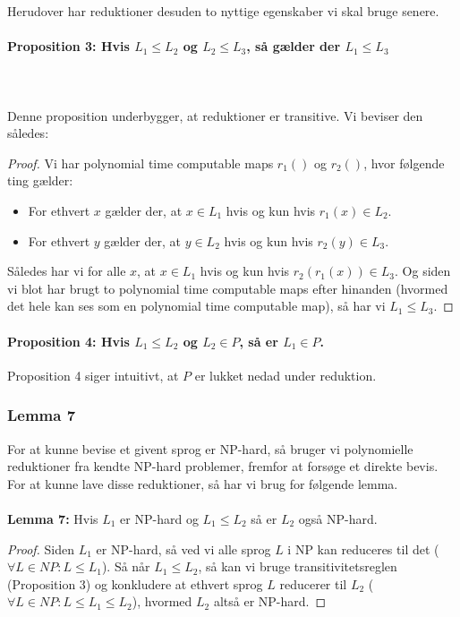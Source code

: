 Herudover har  reduktioner desuden to nyttige egenskaber vi skal bruge senere.

\paragraph{Proposition 3: Hvis $L_1 \leq L_2$ og $L_2 \leq L_3$, så gælder der $L_1 \leq L_3$}
~\\
~\\
Denne proposition underbygger, at reduktioner er transitive. Vi beviser den således:

\begin{proof}
 Vi har polynomial time computable maps $r_1()$ og $r_2()$, hvor følgende ting gælder:

\begin{itemize}
 \item For ethvert $x$ gælder der, at $x \in L_1$ hvis og kun hvis $r_1(x) \in L_2$.
 \item For ethvert $y$ gælder der, at $y \in L_2$ hvis og kun hvis $r_2(y) \in L_3$.
\end{itemize}

Således har vi for alle $x$, at $x \in L_1$ hvis og kun hvis $r_2(r_1(x)) \in L_3$. Og siden vi blot har brugt to polynomial time computable maps efter hinanden (hvormed det hele kan ses som en polynomial time computable map), så har vi $L_1 \leq L_3$.
\end{proof}

\paragraph{Proposition 4: Hvis $L_1 \leq L_2$ og $L_2 \in P$, så er $L_1 \in P$.}

Proposition 4 siger intuitivt, at $P$ er lukket nedad under reduktion. 


\subsubsection{Lemma 7}

For at kunne bevise et givent sprog er NP-hard, så bruger vi  polynomielle reduktioner fra kendte NP-hard problemer, fremfor at forsøge et direkte bevis. For at kunne lave disse reduktioner, så har vi brug for følgende lemma.\\
~\\
\textbf{Lemma 7:} Hvis $L_1$ er NP-hard og $L_1 \leq L_2$ så er $L_2$ også NP-hard.

\begin{proof}
 Siden $L_1$ er NP-hard, så ved vi alle sprog $L$ i NP kan reduceres til det ($\forall L \in NP: L \leq L_1$). Så når $L_1 \leq L_2$, så kan vi bruge transitivitetsreglen (Proposition 3) og konkludere at ethvert sprog $L$ reducerer til $L_2$ ($\forall L \in NP: L \leq L_1 \leq L_2$), hvormed $L_2$ altså er NP-hard.
\end{proof}


